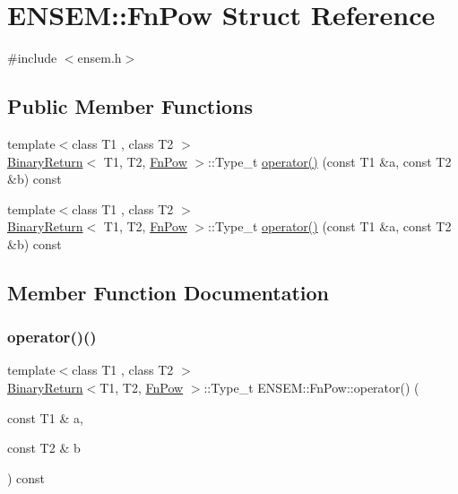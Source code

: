 \hypertarget{structENSEM_1_1FnPow}{}\section{E\+N\+S\+EM\+:\+:Fn\+Pow Struct Reference}
\label{structENSEM_1_1FnPow}


{\ttfamily \#include $<$ensem.\+h$>$}

\subsection*{Public Member Functions}
\begin{DoxyCompactItemize}
\item 
{\footnotesize template$<$class T1 , class T2 $>$ }\\\mbox{\hyperlink{structENSEM_1_1BinaryReturn}{Binary\+Return}}$<$ T1, T2, \mbox{\hyperlink{structENSEM_1_1FnPow}{Fn\+Pow}} $>$\+::Type\+\_\+t \mbox{\hyperlink{structENSEM_1_1FnPow_ad7f15cdc82e84e8bd8e07a4bc8dcb633}{operator()}} (const T1 \&a, const T2 \&b) const
\item 
{\footnotesize template$<$class T1 , class T2 $>$ }\\\mbox{\hyperlink{structENSEM_1_1BinaryReturn}{Binary\+Return}}$<$ T1, T2, \mbox{\hyperlink{structENSEM_1_1FnPow}{Fn\+Pow}} $>$\+::Type\+\_\+t \mbox{\hyperlink{structENSEM_1_1FnPow_ad7f15cdc82e84e8bd8e07a4bc8dcb633}{operator()}} (const T1 \&a, const T2 \&b) const
\end{DoxyCompactItemize}


\subsection{Member Function Documentation}
\mbox{\label{structENSEM_1_1FnPow_ad7f15cdc82e84e8bd8e07a4bc8dcb633}} 
\subsubsection{\texorpdfstring{operator()()}{operator()()}\hspace{0.1cm}{\footnotesize\ttfamily [1/2]}}
{\footnotesize\ttfamily template$<$class T1 , class T2 $>$ \\
\mbox{\hyperlink{structENSEM_1_1BinaryReturn}{Binary\+Return}}$<$T1, T2, \mbox{\hyperlink{structENSEM_1_1FnPow}{Fn\+Pow}} $>$\+::Type\+\_\+t E\+N\+S\+E\+M\+::\+Fn\+Pow\+::operator() (\begin{DoxyParamCaption}\item[{const T1 \&}]{a,  }\item[{const T2 \&}]{b }\end{DoxyParamCaption}) const\hspace{0.3cm}{\ttfamily [inline]}}

